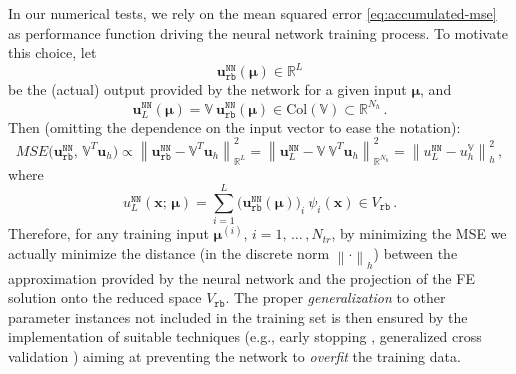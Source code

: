 \documentclass{elsarticle}
\numberwithin{equation}{section}
\theoremstyle{theorem}
\theoremstyle{definition}
\theoremstyle{remark}
\theoremstyle{proposition}
\numberwithin{figure}{section}
\newcommand{\norm}[1]{\left\lVert#1\right\rVert}
\newcommand{\bg}[1]{\boldsymbol{#1}}
\begin{document}
		In our numerical tests, we rely on the mean squared error \eqref{eq:accumulated-mse} as performance function driving the neural network training process. To motivate this choice, let 
		\begin{equation*}
			\mathbf{u}_{\texttt{rb}}^{\texttt{NN}}(\bg{\mu}) \in \mathbb{R}^L
		\end{equation*}
		be the (actual) output provided by the network for a given input $\bg{\mu}$, and 
		\begin{equation*}
			\mathbf{u}_L^{\texttt{NN}}(\bg{\mu}) = \mathbb{V} ~ \mathbf{u}_{\texttt{rb}}^{\texttt{NN}}(\bg{\mu}) \in \text{Col}(\mathbb{V}) \subset \mathbb{R}^{N_h} \, . 
		\end{equation*}
		Then (omitting the dependence on the input vector to ease the notation):
		\begin{equation*}
			\label{eq:pod-nn-mse}
				MSE \big( \mathbf{u}_{\texttt{rb}}^{\texttt{NN}}, \, \mathbb{V}^T \mathbf{u}_h \big) \propto \norm{\mathbf{u}_{\texttt{rb}}^{\texttt{NN}} - \mathbb{V}^T \mathbf{u}_h}^2_{\mathbb{R}^L} = \norm{\mathbf{u}_L^{\texttt{NN}} - \mathbb{V} ~ \mathbb{V}^T \mathbf{u}_h}^2_{\mathbb{R}^{N_h}} = \norm{u_L^{\texttt{NN}} - u_h^{\mathbb{V}}}^2_h \, ,
		\end{equation*} 
		where
		\begin{equation*}
			\label{eq:pod-nn-solution}
			u_L^{\texttt{NN}}(\bg{x}; \, \bg{\mu}) = \sum_{i = 1}^L \big( \mathbf{u}_{\texttt{rb}}^{\texttt{NN}}(\bg{\mu}) \big)_i ~ \psi_i(\bg{x}) \in V_{\texttt{rb}} \, .
		\end{equation*}
		Therefore, for any training input $\bg{\mu}^{(i)}$, $i = 1, \, \ldots \, , N_{tr}$, by minimizing the MSE we actually minimize the distance (in the discrete norm $\norm{\cdot}_h$) between the approximation provided by the neural network and the projection of the FE solution onto the reduced space $V_{\texttt{rb}}$. The proper \emph{generalization} to other parameter instances not included in the training set is then ensured by the implementation of suitable techniques (e.g., early stopping \cite{Mat16}, generalized cross validation \cite{Koh95}) aiming at preventing the network to \emph{overfit} the training data.
		
		
\end{document}
